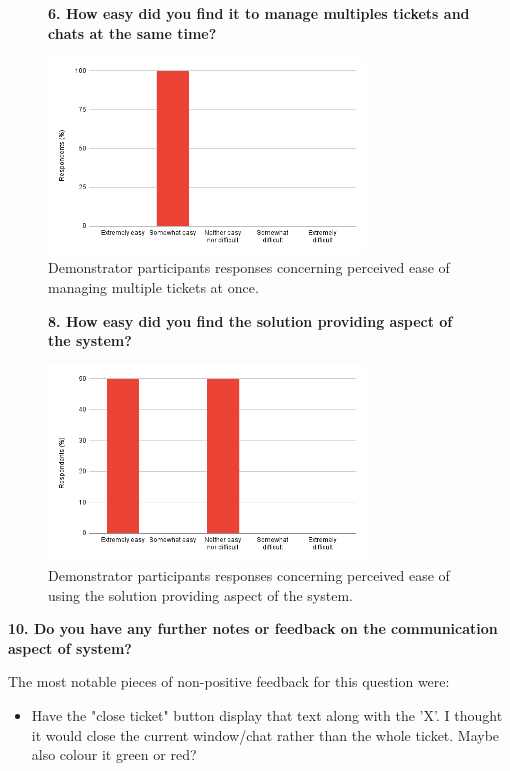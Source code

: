 \begin{figure}[H]
    \centering
    \textbf{6. How easy did you find it to manage multiples tickets and chats at the same time?}\par\medskip
    \includegraphics[width=0.75\textwidth]{10evaluation/images/dem6.png}
    \caption{Demonstrator participants responses concerning perceived ease of managing multiple tickets at once.}
    \label{fig:dem6}
\end{figure}

\begin{figure}[H]
    \centering
    \textbf{8. How easy did you find the solution providing aspect of the system?}\par\medskip
    \includegraphics[width=0.75\textwidth]{10evaluation/images/dem8.png}
    \caption{Demonstrator participants responses concerning perceived ease of using the solution providing aspect of the system.}
    \label{fig:dem8}
\end{figure}

\textbf{10. Do you have any further notes or feedback on the communication aspect of system?}\par\medskip

The most notable pieces of non-positive feedback for this question were:

\begin{itemize}
    \item Have the "close ticket" button display that text along with the 'X'. I thought it would close the current window/chat rather than the whole ticket. Maybe also colour it green or red?	
\end{itemize}

